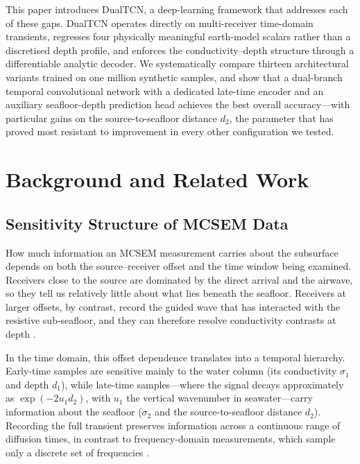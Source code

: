 \documentclass[journal]{IEEEtran}
\begin{document}
This paper introduces DualTCN, a deep-learning framework that
addresses each of these gaps. DualTCN operates directly on
multi-receiver time-domain transients, regresses four physically
meaningful earth-model scalars rather than a discretised depth
profile, and enforces the conductivity--depth structure through a
differentiable analytic decoder. We systematically compare thirteen
architectural variants trained on one million synthetic samples, and
show that a dual-branch temporal convolutional network with a
dedicated late-time encoder and an auxiliary seafloor-depth prediction
head achieves the best overall accuracy---with particular gains on
the source-to-seafloor distance $d_2$, the parameter that has proved most
resistant to improvement in every other configuration we tested.

\section{Background and Related Work}
\label{sec:related_work}

\subsection{Sensitivity Structure of MCSEM Data}

How much information an MCSEM measurement carries about the
subsurface depends on both the source--receiver offset and the time
window being examined. Receivers close to the source are dominated by
the direct arrival and the airwave, so they tell us relatively little
about what lies beneath the seafloor. Receivers at larger offsets, by
contrast, record the guided wave that has interacted with the
resistive sub-seafloor, and they can therefore resolve conductivity
contrasts at depth \citep{key2012marine}.

In the time domain, this offset dependence translates into a temporal
hierarchy. Early-time samples are sensitive mainly to the water column
(its conductivity $\sigma_1$ and depth $d_1$), while late-time
samples---where the signal decays approximately as
$\exp(-2 u_1 d_2)$, with $u_1$ the vertical wavenumber in
seawater---carry information about the seafloor ($\sigma_2$ and the
source-to-seafloor distance $d_2$). Recording the full transient preserves
information across a continuous range of diffusion times, in contrast
to frequency-domain measurements, which sample only a discrete set
of frequencies \citep{constable2010ten}.
\end{document}
